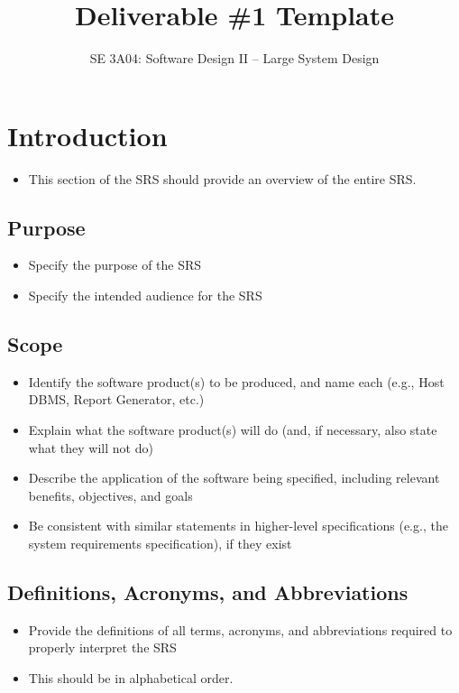 \documentclass[]{article}
\title{Deliverable \#1 Template}
\author{SE 3A04: Software Design II -- Large System Design}
\date{}
\begin{document}
\maketitle	

\section{Introduction}
\label{sec:introduction}

\begin{itemize}
	\item This section of the SRS should provide an overview of the entire SRS.
\end{itemize}


\subsection{Purpose}
\label{sub:purpose}
\begin{itemize}
	\item Specify the purpose of the SRS
	\item Specify the intended audience for the SRS
\end{itemize}

\subsection{Scope}
\label{sub:scope}
\begin{itemize}
	\item Identify the software product(s) to be produced, and name each (e.g., Host DBMS, Report Generator, etc.)
	\item Explain what the software product(s) will do (and, if necessary, also state what they will not do)
	\item Describe the application of the software being specified, including relevant benefits, objectives, and goals
	\item Be consistent with similar statements in higher-level specifications (e.g., the system requirements specification), if they exist
\end{itemize}

\subsection{Definitions, Acronyms, and Abbreviations}
\label{sub:definitions_acronyms_and_abbreviations}
\begin{itemize}
	\item Provide the definitions of all terms, acronyms, and abbreviations required to properly interpret the SRS
	\item This should be in alphabetical order.
\end{itemize}
\end{document}
